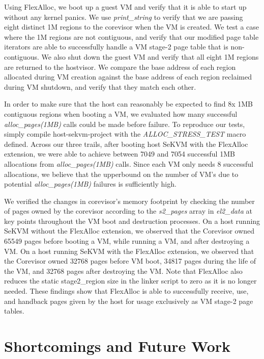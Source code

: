 Using FlexAlloc, we boot up a guest VM and verify that it is able to start up
without any kernel panics. We use \textit{print\_string} to verify that we
are passing eight distinct 1M regions to the corevisor when the VM is created.
We test a case where the 1M regions are not contiguous, and verify that our
modified page table iterators are able to successfully handle a VM stage-2 page
table that is non-contiguous. We also shut down the guest VM and verify that
all eight 1M regions are returned to the hostvisor. We compare the base address
of each region allocated during VM creation against the base address of each
region reclaimed during VM shutdown, and verify that they match each other.

In order to make sure that the host can reasonably be expected to find 8x 1MB
contiguous regions when booting a VM, we evaluated how many successful
\textit{alloc\_pages(1MB)} calls could be made before failure. To reproduce our tests,
simply compile host-sekvm-project with the \textit{ALLOC\_STRESS\_TEST} macro defined.
Across our three trails, after booting host SeKVM with the FlexAlloc extension,
we were able to achieve between 7049 and 7054 successful 1MB allocations
from \textit{alloc\_pages(1MB)} calls. Since each VM only needs 8 successful allocations,
we believe that the upperbound on the number of VM's due to potential \textit{alloc\_pages(1MB)}
failures is sufficiently high.

We verified the changes in corevisor's memory footprint by checking the number of
pages owned by the corevisor according to the \textit{s2\_pages} array in \textit{el2\_data} at key points
throughout the VM boot and destruction processes. On a host running SeKVM without the
FlexAlloc extension, we observed that the Corevisor owned 65549 pages before booting a VM,
while running a VM, and after destroying a VM. On a host running SeKVM with the FlexAlloc
extension, we observed that the Corevisor owned 32768 pages before VM boot, 34817 pages
during the life of the VM, and 32768 pages after destroying the VM. Note that FlexAlloc also
reduces the static stage2_region size in the linker script to zero as it is no longer needed.
These findings show that FlexAlloc is able to successfully receive, use, and handback pages
given by the host for usage exclusively as VM stage-2 page tables.

\section{Shortcomings and Future Work}

